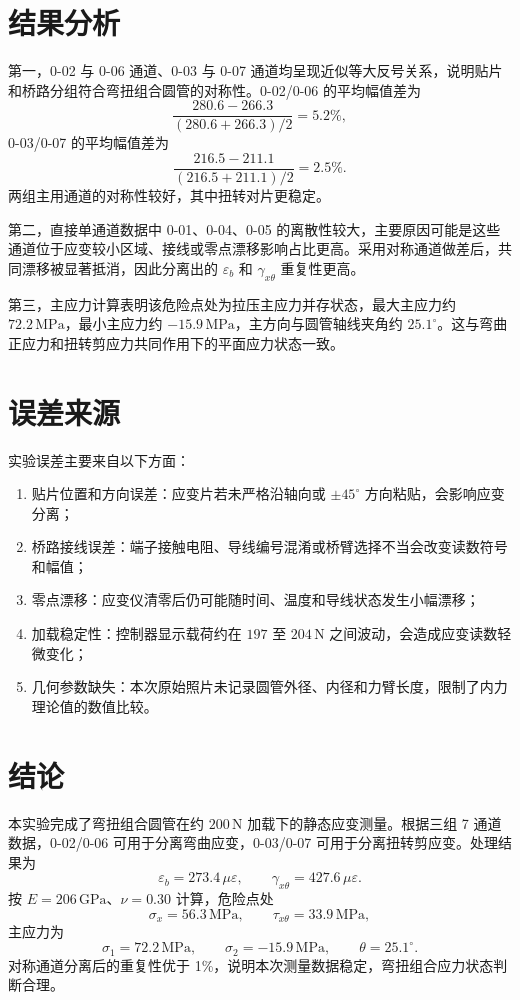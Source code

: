 \documentclass[UTF8,a4paper,10pt]{ctexart}
\newcommand{\ue}{\mu\varepsilon}
\begin{document}
\section{结果分析}

第一，0-02 与 0-06 通道、0-03 与 0-07 通道均呈现近似等大反号关系，说明贴片和桥路分组符合弯扭组合圆管的对称性。0-02/0-06 的平均幅值差为
\begin{equation}
    \frac{280.6-266.3}{(280.6+266.3)/2}=5.2\%,
\end{equation}
0-03/0-07 的平均幅值差为
\begin{equation}
    \frac{216.5-211.1}{(216.5+211.1)/2}=2.5\%.
\end{equation}
两组主用通道的对称性较好，其中扭转对片更稳定。

第二，直接单通道数据中 0-01、0-04、0-05 的离散性较大，主要原因可能是这些通道位于应变较小区域、接线或零点漂移影响占比更高。采用对称通道做差后，共同漂移被显著抵消，因此分离出的 $\varepsilon_b$ 和 $\gamma_{x\theta}$ 重复性更高。

第三，主应力计算表明该危险点处为拉压主应力并存状态，最大主应力约 $72.2\,\mathrm{MPa}$，最小主应力约 $-15.9\,\mathrm{MPa}$，主方向与圆管轴线夹角约 $25.1^\circ$。这与弯曲正应力和扭转剪应力共同作用下的平面应力状态一致。

\section{误差来源}

实验误差主要来自以下方面：
\begin{enumerate}
    \item 贴片位置和方向误差：应变片若未严格沿轴向或 $\pm45^\circ$ 方向粘贴，会影响应变分离；
    \item 桥路接线误差：端子接触电阻、导线编号混淆或桥臂选择不当会改变读数符号和幅值；
    \item 零点漂移：应变仪清零后仍可能随时间、温度和导线状态发生小幅漂移；
    \item 加载稳定性：控制器显示载荷约在 $197$ 至 $204\,\mathrm{N}$ 之间波动，会造成应变读数轻微变化；
    \item 几何参数缺失：本次原始照片未记录圆管外径、内径和力臂长度，限制了内力理论值的数值比较。
\end{enumerate}

\section{结论}

本实验完成了弯扭组合圆管在约 $200\,\mathrm{N}$ 加载下的静态应变测量。根据三组 7 通道数据，0-02/0-06 可用于分离弯曲应变，0-03/0-07 可用于分离扭转剪应变。处理结果为
\[
    \varepsilon_b=273.4\,\ue,\qquad
    \gamma_{x\theta}=427.6\,\ue .
\]
按 $E=206\,\mathrm{GPa}$、$\nu=0.30$ 计算，危险点处
\[
    \sigma_x=56.3\,\mathrm{MPa},\qquad
    \tau_{x\theta}=33.9\,\mathrm{MPa},
\]
主应力为
\[
    \sigma_1=72.2\,\mathrm{MPa},\qquad
    \sigma_2=-15.9\,\mathrm{MPa},\qquad
    \theta=25.1^\circ .
\]
对称通道分离后的重复性优于 1\%，说明本次测量数据稳定，弯扭组合应力状态判断合理。
\end{document}
